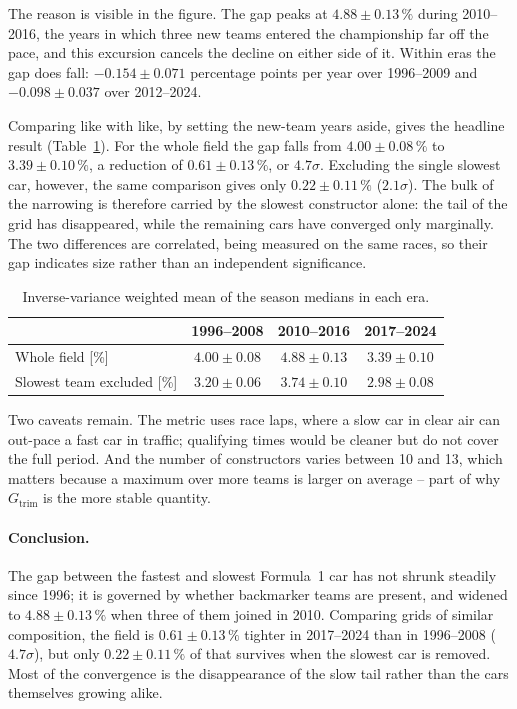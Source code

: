 \documentclass[11pt,a4paper]{article}
\begin{document}
The reason is visible in the figure. The gap peaks at
$4.88 \pm 0.13\,\%$ during 2010--2016, the years in which three new teams
entered the championship far off the pace, and this excursion cancels the
decline on either side of it. Within eras the gap does fall: $-0.154 \pm 0.071$
percentage points per year over 1996--2009 and $-0.098 \pm 0.037$ over
2012--2024.

Comparing like with like, by setting the new-team years aside, gives the
headline result (Table~\ref{tab:eras}). For the whole field the gap falls from
$4.00 \pm 0.08\,\%$ to $3.39 \pm 0.10\,\%$, a reduction of
$0.61 \pm 0.13\,\%$, or $4.7\sigma$. Excluding the single slowest car, however,
the same comparison gives only $0.22 \pm 0.11\,\%$ ($2.1\sigma$). The bulk of
the narrowing is therefore carried by the slowest constructor alone: the tail of
the grid has disappeared, while the remaining cars have converged only
marginally. The two differences are correlated, being measured on the same
races, so their gap indicates size rather than an independent significance.

\begin{table}[htbp]
  \centering\small
  \begin{tabular}{lccc}
    \toprule
    & 1996--2008 & 2010--2016 & 2017--2024 \\
    \midrule
    Whole field [\%]            & $4.00 \pm 0.08$ & $4.88 \pm 0.13$ & $3.39 \pm 0.10$ \\
    Slowest team excluded [\%]  & $3.20 \pm 0.06$ & $3.74 \pm 0.10$ & $2.98 \pm 0.08$ \\
    \bottomrule
  \end{tabular}
  \caption{Inverse-variance weighted mean of the season medians in each era.}
  \label{tab:eras}
\end{table}

Two caveats remain. The metric uses race laps, where a slow car in clear air can
out-pace a fast car in traffic; qualifying times would be cleaner but do not
cover the full period. And the number of constructors varies between 10 and 13,
which matters because a maximum over more teams is larger on average -- part of
why $G_{\text{trim}}$ is the more stable quantity.

\paragraph{Conclusion.} The gap between the fastest and slowest Formula~1 car
has not shrunk steadily since 1996; it is governed by whether backmarker teams
are present, and widened to $4.88 \pm 0.13\,\%$ when three of them joined in
2010. Comparing grids of similar composition, the field is
$0.61 \pm 0.13\,\%$ tighter in 2017--2024 than in 1996--2008 ($4.7\sigma$), but
only $0.22 \pm 0.11\,\%$ of that survives when the slowest car is removed. Most
of the convergence is the disappearance of the slow tail rather than the cars
themselves growing alike.
\end{document}

